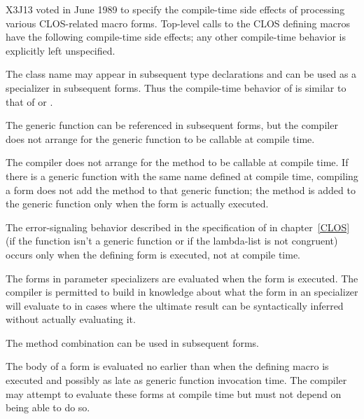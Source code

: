 X3J13 voted in June 1989 
to specify the compile-time side effects of processing various CLOS-related
macro forms.  Top-level calls to the CLOS defining macros have the
 following compile-time side effects; any other compile-time behavior
 is explicitly left unspecified.

\begin{flushdesc}
\item[\cdf{defclass}]
The class name may appear in subsequent type declarations and
can be used as a specializer in subsequent  forms.
Thus the compile-time behavior of  is similar to that of
 or .

\item[\cdf{defgeneric}]
The generic function can be referenced in subsequent  forms,
but the compiler does not arrange for the generic function to be callable
    at compile time.

\item[\cdf{defmethod}]  
The compiler does not arrange for the method to be callable at compile
    time.  If there is a generic function with the same name defined at
    compile time, compiling a  form does not add the method to that 
    generic function; the method is added to the generic
    function only when the  form is actually executed.

    The error-signaling behavior described in the specification of
     in chapter~\ref{CLOS} (if the function isn't a generic function
    or if the lambda-list is not congruent) occurs only when the defining
    form is executed, not at compile time.

    The forms in  parameter specializers are evaluated when the 
    form is executed.  The compiler is permitted to build in knowledge
    about what the form in an  specializer will evaluate to in cases
    where the ultimate result can be syntactically inferred without
    actually evaluating it.

\item[\cdf{define-method-combination}]
The method combination can be used in subsequent  forms.  

    The body of a  form is evaluated no earlier 
    than when the defining macro is executed and possibly as late as 
    generic function invocation time.  The compiler may attempt to
    evaluate these forms at compile time but must not depend on being able
    to do so.
\end{flushdesc}

